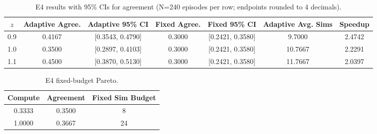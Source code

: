 \begin{table}[H]
  \centering
  \caption{E4 results with 95\% CIs for agreement (N=240 episodes per row; endpoints rounded to 4 decimals).}
  \vspace{0.25em}
  \begin{adjustbox}{width=\linewidth}
  \begin{tabular}{c c c c c c c}
    \toprule
    $z$ & Adaptive Agree. & Adaptive 95\% CI & Fixed Agree. & Fixed 95\% CI & Adaptive Avg. Sims & Speedup \\
    \midrule
    0.9 & 0.4167 & [0.3543, 0.4790] & 0.3000 & [0.2421, 0.3580] & 9.7000 & 2.4742 \\
    1.0 & 0.3500 & [0.2897, 0.4103] & 0.3000 & [0.2421, 0.3580] & 10.7667 & 2.2291 \\
    1.1 & 0.4500 & [0.3870, 0.5130] & 0.3000 & [0.2421, 0.3580] & 11.7667 & 2.0397 \\
    \bottomrule
  \end{tabular}
  \end{adjustbox}
\end{table}

\begin{table}[H]
  \centering
  \caption{E4 fixed-budget Pareto.}
  \vspace{0.25em}
  \begin{adjustbox}{width=\linewidth}
  \begin{tabular}{c c c}
    \toprule
    Compute & Agreement & Fixed Sim Budget \\
    \midrule
    0.3333 & 0.3500 & 8 \\
    1.0000 & 0.3667 & 24 \\
    \bottomrule
  \end{tabular}
  \end{adjustbox}
\end{table}

